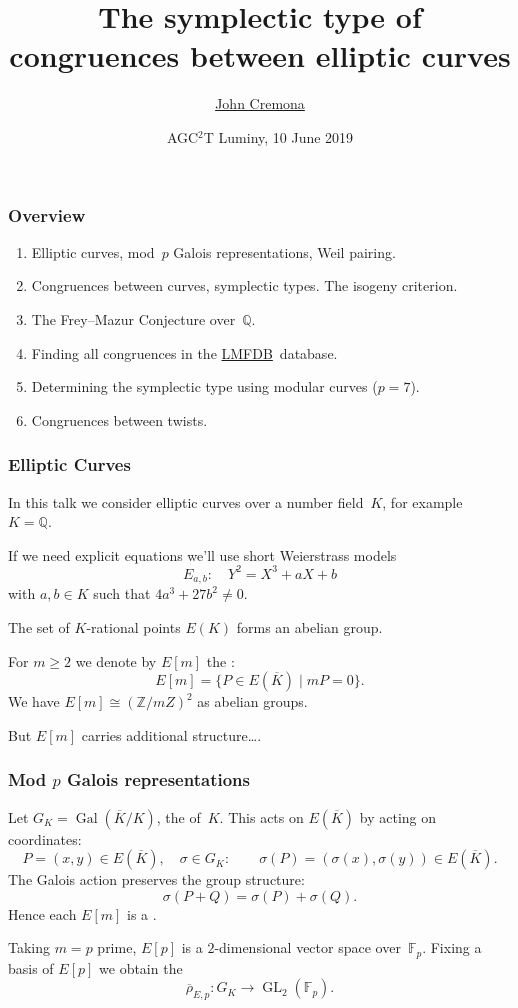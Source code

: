 \documentclass[compress]{beamer}
\title
{
The symplectic type of congruences between elliptic curves
}
\author{\href{https://warwick.ac.uk/fac/sci/maths/people/staff/john_cremona/}{John Cremona}}
\institute{University of Warwick\\---\\ joint work with
  \href{https://homepages.warwick.ac.uk/staff/Nuno.Freitas/}{Nuno Freitas}
  (Warwick) %
}
\date{AGC${}^2$T Luminy, 10 June 2019}
\newcommand{\Q}{\mathbb Q}
\newcommand{\Kbar}{\overline{K}}
\newcommand{\rhobar}{\overline{\rho}}
\newcommand{\F}{\mathbb F}
\newcommand{\Z}{\mathbb Z}
\newcommand{\GL}{\operatorname{GL}}
\newcommand{\Gal}{\operatorname{Gal}}
\newcommand{\LMFDB}{\href{http://www.lmfdb.org/EllipticCurve/Q}{\color{blue}LMFDB}}
\newcommand{\high}[1]{\emph{\color{blue}{#1}}}
\begin{document}


\begin{frame}\frametitle{Overview}
 \begin{enumerate}
\item Elliptic curves, mod~$p$ Galois representations, Weil pairing.
\item Congruences between curves, symplectic types.  The isogeny criterion.
\item The Frey--Mazur Conjecture over~$\Q$. %
\item Finding all congruences in the \LMFDB\ database. %
\item Determining the symplectic type using modular curves
  ($p=7$). %
\item Congruences between twists.
 \end{enumerate}


\end{frame}

\begin{frame}\frametitle{Elliptic Curves}
In this talk we consider elliptic curves over a number field~$K$, for
example ~$K=\Q$.

If we need explicit equations we'll use short Weierstrass models
\[  E_{a,b}:\quad Y^2 = X^3+aX+b
\]
with $a,b\in K$ such that $4 a^{3} + 27 b^{2} \not=0$. \pause

The set of $K$-rational points $E(K)$ forms an abelian group.

For $m\ge2$ we denote by $E[m]$ the \high{$m$-torsion subgroup}:
\[
  E[m] = \{ P \in E(\Kbar) \mid mP=0 \}.
  \]
  \pause
  We have $E[m]\cong (\Z/mZ)^2$ as abelian groups.
  \medskip
  
  But $E[m]$ carries additional structure\dots.
\end{frame}

\begin{frame}\frametitle{Mod $p$ Galois representations}
  Let $G_K=\Gal(\Kbar/K)$, the \high{absolute Galois group} of~$K$.
  This acts on $E(\Kbar)$ by acting on coordinates:
  \[
   P=(x,y)\in E(\Kbar), \quad\sigma\in G_K:\qquad
   \sigma(P)=(\sigma(x),\sigma(y))\in E(\Kbar).
   \]
   \pause
 The Galois action preserves the group structure:
   \[
   \sigma(P+Q)=\sigma(P)+\sigma(Q).
   \]
   Hence each $E[m]$ is a \high{$G_K$-module}.
   \pause\medskip

   Taking $m=p$ prime, $E[p]$ is a $2$-dimensional vector space
   over~$\F_p$.  Fixing a basis of $E[p]$ we obtain the \high{mod~$p$
   Galois representation}
   \[
   \rhobar_{E,p}: G_K \to \GL_2(\F_p).
   \]

\end{frame}
\end{document}
